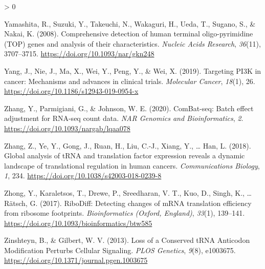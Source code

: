 \documentclass[
  12pt,
  openany]{book}
\newlength{\cslhangindent}
\newenvironment{CSLReferences}[2] %
 {%
  \setlength{\parindent}{0pt}
  \ifodd #1 \everypar{\setlength{\hangindent}{\cslhangindent}}\ignorespaces\fi
  \ifnum #2 > 0
  \setlength{\parskip}{#2\baselineskip}
  \fi
 }%
 {}
\begin{document}
\begin{CSLReferences}{1}{0}
\leavevmode\hypertarget{ref-Yamashita2008}{}%
Yamashita, R., Suzuki, Y., Takeuchi, N., Wakaguri, H., Ueda, T., Sugano, S., \& Nakai, K. (2008). Comprehensive detection of human terminal oligo-pyrimidine ({TOP}) genes and analysis of their characteristics. \emph{Nucleic Acids Research}, \emph{36}(11), 3707--3715. \url{https://doi.org/10.1093/nar/gkn248}

\leavevmode\hypertarget{ref-Yang2019}{}%
Yang, J., Nie, J., Ma, X., Wei, Y., Peng, Y., \& Wei, X. (2019). Targeting {PI3K} in cancer: Mechanisms and advances in clinical trials. \emph{Molecular Cancer}, \emph{18}(1), 26. \url{https://doi.org/10.1186/s12943-019-0954-x}

\leavevmode\hypertarget{ref-Zhang2020}{}%
Zhang, Y., Parmigiani, G., \& Johnson, W. E. (2020). {ComBat}-seq: Batch effect adjustment for {RNA}-seq count data. \emph{NAR Genomics and Bioinformatics}, \emph{2}. \url{https://doi.org/10.1093/nargab/lqaa078}

\leavevmode\hypertarget{ref-Zhang2018}{}%
Zhang, Z., Ye, Y., Gong, J., Ruan, H., Liu, C.-J., Xiang, Y., \ldots{} Han, L. (2018). Global analysis of {tRNA} and translation factor expression reveals a dynamic landscape of translational regulation in human cancers. \emph{Communications Biology}, \emph{1}, 234. \url{https://doi.org/10.1038/s42003-018-0239-8}

\leavevmode\hypertarget{ref-Zhong2017}{}%
Zhong, Y., Karaletsos, T., Drewe, P., Sreedharan, V. T., Kuo, D., Singh, K., \ldots{} Rätsch, G. (2017). {RiboDiff}: Detecting changes of {mRNA} translation efficiency from ribosome footprints. \emph{Bioinformatics (Oxford, England)}, \emph{33}(1), 139--141. \url{https://doi.org/10.1093/bioinformatics/btw585}

\leavevmode\hypertarget{ref-Zinshteyn2013}{}%
Zinshteyn, B., \& Gilbert, W. V. (2013). Loss of a {Conserved tRNA Anticodon Modification Perturbs Cellular Signaling}. \emph{PLOS Genetics}, \emph{9}(8), e1003675. \url{https://doi.org/10.1371/journal.pgen.1003675}

\end{CSLReferences}
\end{document}
